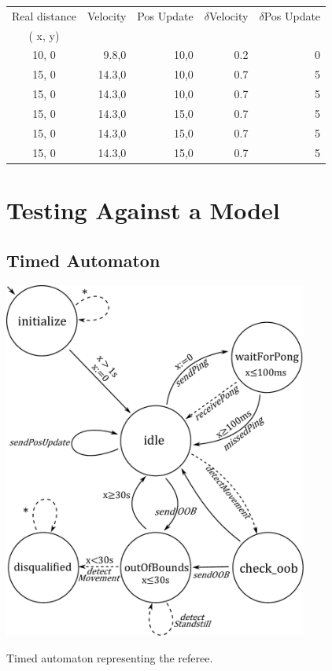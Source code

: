 \documentclass[12pt]{article}
\begin{document}
\begin{tabular}{ | c || r | r | r | r | }
\hline
Real distance & Velocity & Pos Update & $\delta$Velocity & $\delta$Pos Update \\
 ( x, y) & & & & \\ \hline
10, 0 & 9.8,0 & 10,0 & 0.2 & 0 \\ \hline
15, 0 & 14.3,0 & 10,0 & 0.7 & 5 \\ \hline
15, 0 & 14.3,0 & 10,0 & 0.7 & 5 \\ \hline
15, 0 & 14.3,0 & 15,0 & 0.7 & 5 \\ \hline
15, 0 & 14.3,0 & 15,0 & 0.7 & 5 \\ \hline
15, 0 & 14.3,0 & 15,0 & 0.7 & 5 \\ \hline
\end{tabular}

\section*{Testing Against a Model}

\subsection*{Timed Automaton}
\begin{center}


\includegraphics[width = 0.75\textwidth]{images/ref_ta.pdf}

Timed automaton representing the referee.

\end{center}
\end{document}
